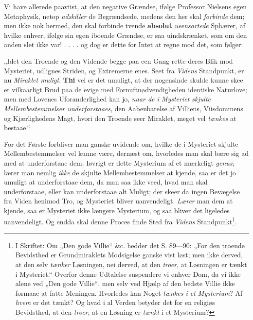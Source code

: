 \documentclass[12pt,a4paper]{book}
\newcommand{\opage}[1]{\marginnote{\footnotesize\textit{[#1]}}}
\begin{document}
Vi have allerede paaviist, at den negative Grændse,
ifølge Professor Nielsens egen Metaphysik, netop \emph{adskiller}
de Begrændsede, medens den her skal \emph{forbinde} dem;
men ikke nok hermed, den skal forbinde tvende \textbf{absolut}
\emph{ueensartede} Sphærer, af hvilke enhver, ifølge sin
egen iboende Grændse, er saa uindskrænket, som om den
anden slet ikke var! . . . . og dog er dette for Intet at
regne mod det, som følger:

„Idet den Troende og den Vidende begge paa een
Gang rette deres Blik mod Mysteriet, udlignes Striden,
og Extremerne enes. Seet fra \emph{Videns} Standpunkt, er
nu \emph{Miraklet muligt}. \textbf{Thi} vel er det umuligt, at
der nogensinde skulde kunne skee et vilkaarligt Brud paa
de evige med Fornuftnødvendigheden identiske Naturlove;
men med Lovenes Uforanderlighed kan jo, \emph{naar de i
\opage{19}\setcounter{footnote}{0}%
Mysteriet skjulte Mellembestemmelser underforstaaes},
den Aabenbarelse af Villiens, Viisdommens
og Kjærlighedens Magt, hvori den Troende seer Miraklet,
meget vel \emph{tænkes} at bestaae.“

For det Første forbliver man ganske uvidende om,
hvilke de i Mysteriet skjulte Mellembestemmelser vel kunne
være, dernæst om, hvorledes man skal bære sig ad med
at underforstaae dem. Iøvrigt er dette Mysterium af et
mærkeligt \textit{genus}; lærer man nemlig \emph{ikke} de skjulte
Mellembestemmelser at kjende, saa er det jo umuligt at
underforstaae dem, da man saa ikke veed, hvad man skal
underforstaae, eller kan underforstaae alt Muligt; der
skeer da ingen Bevægelse fra Viden henimod Tro, og
Mysteriet bliver uanvendeligt. \emph{Lærer} man dem at
kjende, saa er Mysteriet ikke længere Mysterium, og saa
bliver det ligeledes uanvendeligt. Og endda skal denne
Proces finde Sted fra \emph{Videns} Standpunkt\footnote{I Skriftet: Om „Den gode Villie“ \&c. hedder det S. 89---90: „For den troende Bevidsthed er Grundmiraklets Modsigelse ganske vist løst; men ikke derved, at den selv \emph{tænker} Løsningen, nei derved, at den \emph{troer}, at Løsningen er tænkt i Mysteriet.“ Overfor denne Udtalelse suspendere vi enhver Dom, da vi ikke alene ved „Den gode Villie“, men selv ved Hjælp af den bedste Villie ikke formaae at fatte Meningen. Hvorledes kan Noget \emph{tænkes i et Mysterium}? Af \emph{hvem} er det tænkt? Og hvad i al Verden betyder det for en religiøs Bevidsthed, at den \emph{troer}, at en Løsning er \emph{tænkt} i et Mysterium?}.
\end{document}
